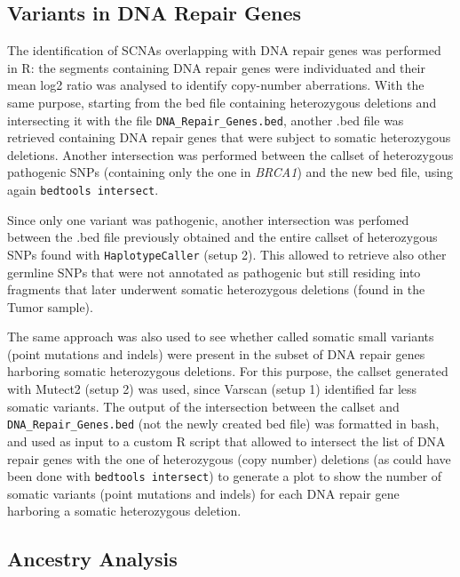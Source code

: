 \documentclass[11pt]{article}
\begin{document}
\subsection*{Variants in DNA Repair Genes}

The identification of SCNAs overlapping with DNA repair genes was performed in R: the segments containing DNA repair genes were individuated and their mean log2 ratio was analysed to identify copy-number aberrations. With the same purpose, starting from the bed file containing heterozygous deletions and intersecting it with the file \texttt{DNA\_Repair\_Genes.bed}, another .bed file was retrieved containing DNA repair genes that were subject to somatic heterozygous deletions. Another intersection was performed between the callset of heterozygous pathogenic SNPs (containing only the one in \emph{BRCA1}) and the new bed file, using again \texttt{bedtools intersect}. 

Since only one variant was pathogenic, another intersection was perfomed between the .bed file previously obtained and the entire callset of heterozygous SNPs found with \texttt{HaplotypeCaller} (setup 2). This allowed to retrieve also other germline SNPs that were not annotated as pathogenic but still residing into fragments that later underwent somatic heterozygous deletions (found in the Tumor sample). 

The same approach was also used to see whether called somatic small variants (point mutations and indels) were present in the subset of DNA repair genes harboring somatic heterozygous deletions. For this purpose, the callset generated with Mutect2 (setup 2) was used, since Varscan (setup 1) identified far less somatic variants.
The output of the intersection between the callset and \texttt{DNA\_Repair\_Genes.bed} (not the newly created bed file) was formatted in bash, and used as input to a custom R script that allowed to intersect the list of DNA repair genes with the one of heterozygous (copy number) deletions (as could have been done with \texttt{bedtools intersect}) to generate a plot to show the number of somatic variants (point mutations and indels) for each DNA repair gene harboring a somatic heterozygous deletion.



\subsection*{Ancestry Analysis}
\end{document}
